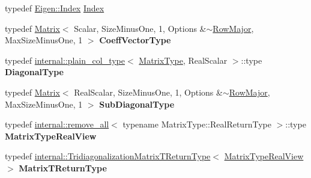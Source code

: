 \begin{DoxyCompactItemize}
\item 
typedef \hyperlink{namespace_eigen_a62e77e0933482dafde8fe197d9a2cfde}{Eigen\+::\+Index} \hyperlink{group___eigenvalues___module_a7bd1f9fccec1e93b77a2214b2d30aae9}{Index}
\item 
\mbox{\label{group___eigenvalues___module_ad8891a972b6b5c5588dc4109597d6b58}} 
typedef \hyperlink{group___core___module_class_eigen_1_1_matrix}{Matrix}$<$ Scalar, Size\+Minus\+One, 1, Options \&$\sim$\hyperlink{group__enums_ggaacded1a18ae58b0f554751f6cdf9eb13acfcde9cd8677c5f7caf6bd603666aae3}{Row\+Major}, Max\+Size\+Minus\+One, 1 $>$ {\bfseries Coeff\+Vector\+Type}
\item 
\mbox{\label{group___eigenvalues___module_aac5303dbff6921f9a1b9dad0cacfe00c}} 
typedef \hyperlink{struct_eigen_1_1internal_1_1plain__col__type}{internal\+::plain\+\_\+col\+\_\+type}$<$ \hyperlink{group___eigenvalues___module_add0f4b2216d0ea8ee0f7d8525deaf0a9}{Matrix\+Type}, Real\+Scalar $>$\+::type {\bfseries Diagonal\+Type}
\item 
\mbox{\label{group___eigenvalues___module_a68729d89d61edbae954fc7ad0b72a5b8}} 
typedef \hyperlink{group___core___module_class_eigen_1_1_matrix}{Matrix}$<$ Real\+Scalar, Size\+Minus\+One, 1, Options \&$\sim$\hyperlink{group__enums_ggaacded1a18ae58b0f554751f6cdf9eb13acfcde9cd8677c5f7caf6bd603666aae3}{Row\+Major}, Max\+Size\+Minus\+One, 1 $>$ {\bfseries Sub\+Diagonal\+Type}
\item 
\mbox{\label{group___eigenvalues___module_a28b71fa9329f5881fa2fc6732941c2b3}} 
typedef \hyperlink{struct_eigen_1_1internal_1_1remove__all}{internal\+::remove\+\_\+all}$<$ typename Matrix\+Type\+::\+Real\+Return\+Type $>$\+::type {\bfseries Matrix\+Type\+Real\+View}
\item 
\mbox{\label{group___eigenvalues___module_af7d2f1a605207a321f494d9ee216f8f5}} 
typedef \hyperlink{struct_eigen_1_1internal_1_1_tridiagonalization_matrix_t_return_type}{internal\+::\+Tridiagonalization\+Matrix\+T\+Return\+Type}$<$ \hyperlink{group___sparse_core___module}{Matrix\+Type\+Real\+View} $>$ {\bfseries Matrix\+T\+Return\+Type}
\item 
\mbox{\label{group___eigenvalues___module_aa2b866d55c2210db98a7ab2ccf0d2254}} 

\end{DoxyCompactItemize}
